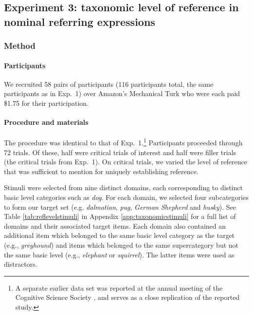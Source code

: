 \documentclass[11pt]{article}
\newcommand{\tableref}[1]{Table \ref{#1}}
\newcommand{\appref}[1]{Appendix \ref{#1}}
\begin{document}
\subsection{Experiment 3: taxonomic level of reference in nominal referring expressions}
\label{sec:exp3}

\subsubsection{Method}

\paragraph{Participants}

We recruited 58 pairs of participants (116 participants total, the same participants as in Exp.~1) over Amazon's Mechanical Turk who were each paid \$1.75 for their participation. 

\paragraph{Procedure and materials}

The procedure was identical to that of Exp.~1.\footnote{A separate earlier data set was reported at the annual meeting of the Cognitive Science Society \cite{GrafEtAl2016}, and serves as a close replication of the reported study.} Participants proceeded through 72 trials. Of these, half were critical trials of interest and half were filler trials (the critical trials from Exp.~1). On critical trials, we varied the level of reference that was sufficient to mention for uniquely establishing reference.

Stimuli were selected from nine distinct domains, each corresponding to distinct basic level categories such as \emph{dog}.  For each domain, we selected four subcategories to form our target set (e.g. \emph{dalmatian}, \emph{pug}, \emph{German Shepherd} and \emph{husky}). See \tableref{tab:reflevelstimuli} in \appref{app:taxonomicstimuli} for a full list of domains and their associated target items. Each domain also contained an additional item which belonged to the same basic level category as the target (e.g., \emph{greyhound}) and items which belonged to the same supercategory but not the same basic level (e.g., \emph{elephant} or \emph{squirrel}). The latter items were used as distractors.
\end{document}
